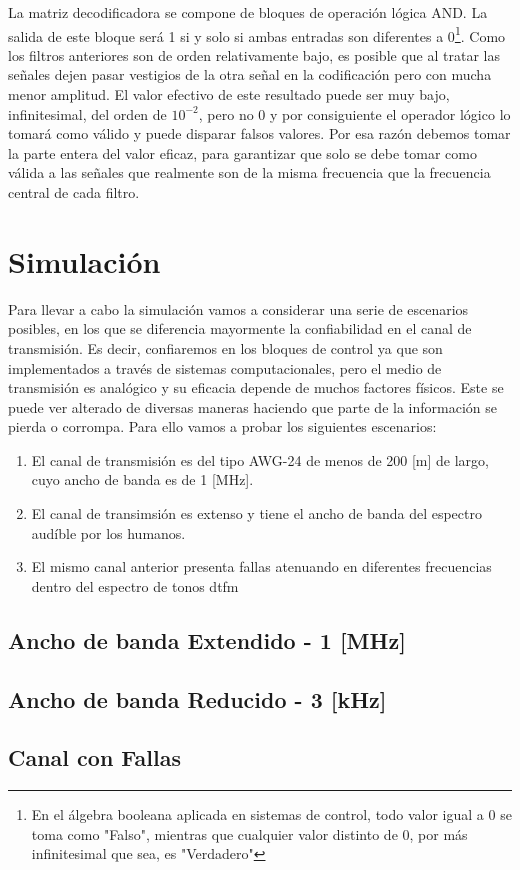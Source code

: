 La matriz decodificadora se compone de bloques de operación lógica AND. La salida de este bloque será 1 si y solo si ambas entradas son diferentes a 0\footnote{En el álgebra booleana aplicada en sistemas de control, todo valor igual a 0 se toma como "Falso", mientras que cualquier valor distinto de 0, por más infinitesimal que sea, es "Verdadero"}. Como los filtros anteriores son de orden relativamente bajo, es posible que al tratar las señales dejen pasar vestigios de la otra señal en la codificación pero con mucha menor amplitud. El valor efectivo de este resultado puede ser muy bajo, infinitesimal, del orden de $10^{-2}$, pero no 0 y por consiguiente el operador lógico lo tomará como válido y puede disparar falsos valores. Por esa razón debemos tomar la parte entera del valor eficaz, para garantizar que solo se debe tomar como válida a las señales que realmente son de la misma frecuencia que la frecuencia central de cada filtro.

\section{Simulación}
Para llevar a cabo la simulación vamos a considerar una serie de escenarios posibles, en los que se diferencia mayormente la confiabilidad en el canal de transmisión. Es decir, confiaremos en los bloques de control ya que son implementados a través de sistemas computacionales, pero el medio de transmisión es analógico y su eficacia depende de muchos factores físicos. Este se puede ver alterado de diversas maneras haciendo que parte de la información se pierda o corrompa. Para ello vamos a probar los siguientes escenarios:

\begin{enumerate}
  \item El canal de transmisión es del tipo AWG-24 de menos de 200 [m] de largo, cuyo ancho de banda es de 1 [MHz].
  \item El canal de transimsión es extenso y tiene el ancho de banda del espectro audíble por los humanos.
  \item El mismo canal anterior presenta fallas atenuando en diferentes frecuencias dentro del espectro de tonos \gls{dtfm}
\end{enumerate}

\subsection{Ancho de banda Extendido - 1 [MHz]}
\subsection{Ancho de banda Reducido - 3 [kHz]}
\subsection{Canal con Fallas}